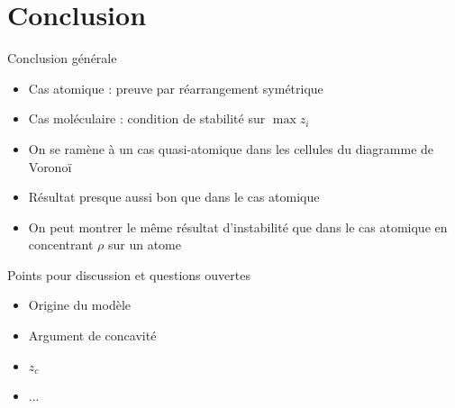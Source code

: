 \documentclass{beamer}
\begin{document}
\section{Conclusion}
\begin{frame}{Conclusion générale}
  \begin{itemize}
  \item Cas atomique : preuve par réarrangement symétrique
  \item Cas moléculaire : condition de stabilité sur $\max z_i$
  \item On se ramène à un cas quasi-atomique dans les cellules du
    diagramme de Voronoï
  \item Résultat presque aussi bon que dans le cas atomique
  \item On peut montrer le même résultat d'instabilité que dans le cas
    atomique en concentrant $\rho$ sur un atome
  \end{itemize}
\end{frame}
\begin{frame}{Points pour discussion et questions ouvertes}
  \begin{itemize}
  \item Origine du modèle
  \item Argument de concavité
  \item $z_c$
  \item ...
  \end{itemize}
\end{frame}
\end{document}
